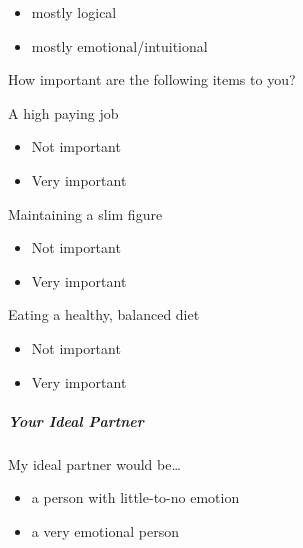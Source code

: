 \documentclass[twoside]{report}
\begin{document}
\begin{multicols}{2}
 \begin{itemize}
  \item
        mostly logical
 \end{itemize}

 \begin{itemize}
  \item
        mostly emotional/intuitional
 \end{itemize}

 How important are the following items to you?

 A high paying job

 \begin{itemize}
  \item
        Not important
 \end{itemize}

 \begin{itemize}
  \item
        Very important
 \end{itemize}

 Maintaining a slim figure

 \begin{itemize}
  \item
        Not important
 \end{itemize}

 \begin{itemize}
  \item
        Very important
 \end{itemize}

 Eating a healthy, balanced diet

 \begin{itemize}
  \item
        Not important
 \end{itemize}

 \begin{itemize}
  \item
        Very important
 \end{itemize}

 \subparagraph{Your Ideal Partner}

 My ideal partner would be\ldots{}

 \begin{itemize}
  \item
        a person with little-to-no emotion
 \end{itemize}

 \begin{itemize}
  \item
        a very emotional person
 \end{itemize}


\end{multicols}
\end{document}
